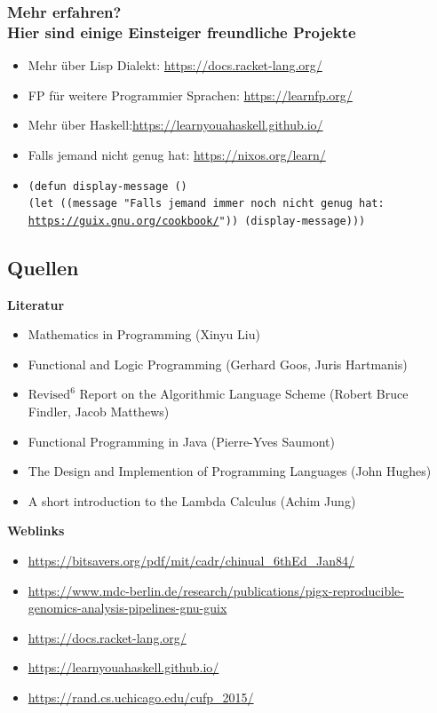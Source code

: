 \documentclass{beamer}
\def\code#1{\texttt{#1}}
\begin{document}
\begin{frame}
\centering
\frametitle{Mehr erfahren? \\ Hier sind einige Einsteiger freundliche Projekte}
\begin{itemize}
    \item Mehr über Lisp Dialekt: \url{https://docs.racket-lang.org/}
    \item FP für weitere Programmier Sprachen: \url{https://learnfp.org/}
    \item Mehr über Haskell:\url{https://learnyouahaskell.github.io/}
    \item Falls jemand nicht genug hat: \url{https://nixos.org/learn/}
    \item \code{(defun display-message () \\
  (let ((message "Falls jemand immer noch nicht genug hat: \url{https://guix.gnu.org/cookbook/}"))
(display-message)))}

\end{itemize}

\end{frame}

\begin{frame}
	\section{Quellen}
	\fontsize{8pt}{10pt}
	\centering
	\textbf{Literatur}
	\begin{itemize}
    \item Mathematics in Programming (Xinyu Liu)
\item Functional and Logic Programming (Gerhard Goos, Juris Hartmanis)
\item $\text{Revised}^6$ Report on the Algorithmic Language
Scheme (Robert Bruce Findler, Jacob Matthews)
\item Functional Programming in Java (Pierre-Yves Saumont)
\item The Design and Implemention of Programming Languages (John Hughes)
\item A short introduction to the Lambda Calculus (Achim Jung)
 \end{itemize}
 \textbf{Weblinks}
	\begin{itemize}
        \item \url{https://bitsavers.org/pdf/mit/cadr/chinual_6thEd_Jan84/}
        \item \url{https://www.mdc-berlin.de/research/publications/pigx-reproducible-genomics-analysis-pipelines-gnu-guix}
        \item \url{https://docs.racket-lang.org/}
        \item \url{https://learnyouahaskell.github.io/}
        \item \url{https://rand.cs.uchicago.edu/cufp_2015/}
	\end{itemize}
 
\end{frame}
\end{document}
